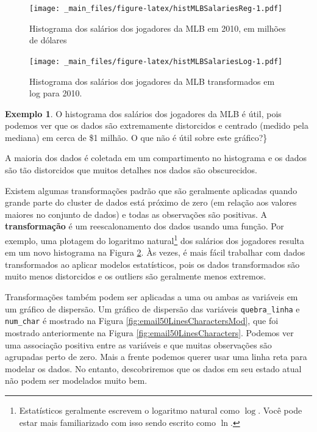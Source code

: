 \documentclass[
]{book}
\theoremstyle{definition}
\theoremstyle{definition}
\newtheorem{example}{Exemplo}[chapter]
\theoremstyle{definition}
\theoremstyle{definition}
\theoremstyle{remark}
\begin{document}
\begin{figure}
\centering
\texttt{[image: \_main\_files/figure-latex/histMLBSalariesReg-1.pdf]}
\caption{\label{fig:histMLBSalariesReg}Histograma dos salários dos jogadores da MLB em 2010, em milhões de dólares}
\end{figure}

\begin{figure}
\centering
\texttt{[image: \_main\_files/figure-latex/histMLBSalariesLog-1.pdf]}
\caption{\label{fig:histMLBSalariesLog}Histograma dos salários dos jogadores da MLB transformados em log para 2010.}
\end{figure}

\begin{example}
\protect\hypertarget{exm:unnamed-chunk-32}{}{\label{exm:unnamed-chunk-32} }O histograma dos salários dos jogadores da MLB é útil, pois podemos ver que os dados são extremamente distorcidos e centrado (medido pela mediana) em cerca de \$1 milhão. O que não é útil sobre este gráfico?\}
\end{example}

A maioria dos dados é coletada em um compartimento no histograma e os dados são tão distorcidos que muitos detalhes nos dados são obscurecidos.

Existem algumas transformações padrão que são geralmente aplicadas quando grande parte do cluster de dados está próximo de zero (em relação aos valores maiores no conjunto de dados) e todas as observações são positivas. A \textbf{transformação} é um reescalonamento dos dados usando uma função. Por exemplo, uma plotagem do logaritmo natural\footnote{Estatísticos geralmente escrevem o logaritmo natural como \(\log\). Você pode estar mais familiarizado com isso sendo escrito como \(\ln\).} dos salários dos jogadores resulta em um novo histograma na Figura \ref{fig:histMLBSalariesLog}. Às vezes, é mais fácil trabalhar com dados transformados ao aplicar modelos estatísticos, pois os dados transformados são muito menos distorcidos e os outliers são geralmente menos extremos.

Transformações também podem ser aplicadas a uma ou ambas as variáveis em um gráfico de dispersão. Um gráfico de dispersão das variáveis \texttt{quebra\_linha} e \texttt{num\_char} é mostrado na Figura \ref{fig:email50LinesCharactersMod}, que foi mostrado anteriormente na Figura \ref{fig:email50LinesCharacters}. Podemos ver uma associação positiva entre as variáveis e que muitas observações são agrupadas perto de zero. Mais a frente podemos querer usar uma linha reta para modelar os dados. No entanto, descobriremos que os dados em seu estado atual não podem ser modelados muito bem.
\end{document}
